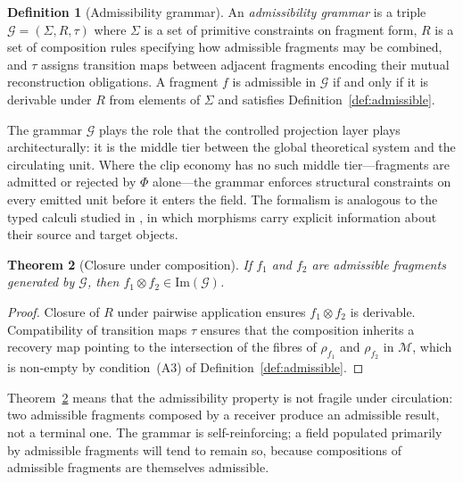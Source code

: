 \documentclass{amsart}
\theoremstyle{plain}
\newtheorem{theorem}{Theorem}[section]
\theoremstyle{definition}
\newtheorem{definition}[theorem]{Definition}
\theoremstyle{remark}
\newcommand{\scalar}{\Phi}
\newcommand{\Man}{\mathcal{M}}
\newcommand{\tensor}{\otimes}
\begin{document}
\begin{definition}[Admissibility grammar]
  \label{def:grammar}
  An \emph{admissibility grammar} is a triple $\mathcal{G} = (\Sigma, R, \tau)$
  where $\Sigma$ is a set of primitive constraints on fragment form, $R$ is a set
  of composition rules specifying how admissible fragments may be combined, and
  $\tau$ assigns transition maps between adjacent fragments encoding their mutual
  reconstruction obligations.  A fragment $f$ is admissible in $\mathcal{G}$ if
  and only if it is derivable under $R$ from elements of $\Sigma$ and satisfies
  Definition~\ref{def:admissible}.
\end{definition}

The grammar $\mathcal{G}$ plays the role that the controlled projection layer plays
architecturally: it is the middle tier between the global theoretical system and
the circulating unit.  Where the clip economy has no such middle tier---fragments
are admitted or rejected by $\scalar$ alone---the grammar enforces structural
constraints on every emitted unit before it enters the field.  The formalism is
analogous to the typed calculi studied in \cite{baez2011}, in which morphisms carry
explicit information about their source and target objects.

\begin{theorem}[Closure under composition]
  \label{thm:closure}
  If $f_1$ and $f_2$ are admissible fragments generated by $\mathcal{G}$, then
  $f_1 \tensor f_2 \in \mathrm{Im}(\mathcal{G})$.
\end{theorem}

\begin{proof}
  Closure of $R$ under pairwise application ensures $f_1 \tensor f_2$ is
  derivable.  Compatibility of transition maps $\tau$ ensures that the composition
  inherits a recovery map pointing to the intersection of the fibres of $\rho_{f_1}$
  and $\rho_{f_2}$ in $\Man$, which is non-empty by condition~(A3) of
  Definition~\ref{def:admissible}.
\end{proof}

Theorem~\ref{thm:closure} means that the admissibility property is not fragile
under circulation: two admissible fragments composed by a receiver produce an
admissible result, not a terminal one.  The grammar is self-reinforcing; a field
populated primarily by admissible fragments will tend to remain so, because
compositions of admissible fragments are themselves admissible.
\end{document}
